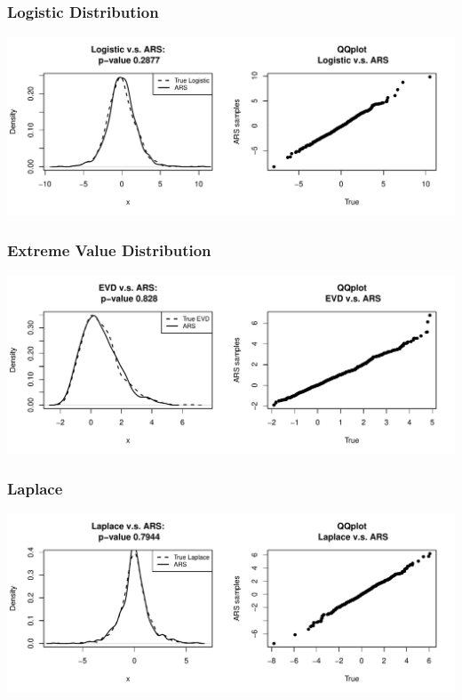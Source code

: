 \documentclass{article}\usepackage[]{graphicx}\usepackage[]{color}
\makeatletter
\def\maxwidth{ %
  \ifdim\Gin@nat@width>\linewidth
    \linewidth
  \else
    \Gin@nat@width
  \fi
}
\newenvironment{knitrout}{}{} %
\makeatother
\begin{document}
\subsubsection{Logistic Distribution}
\begin{knitrout}
\color{fgcolor}
\includegraphics[width=\maxwidth]{figure/logistic-1} 

\end{knitrout}

\subsubsection{Extreme Value Distribution}
\begin{knitrout}
\color{fgcolor}
\includegraphics[width=\maxwidth]{figure/extreme_value-1} 

\end{knitrout}

\subsubsection{Laplace}
\begin{knitrout}
\color{fgcolor}
\includegraphics[width=\maxwidth]{figure/laplace-1} 

\end{knitrout}
\end{document}
